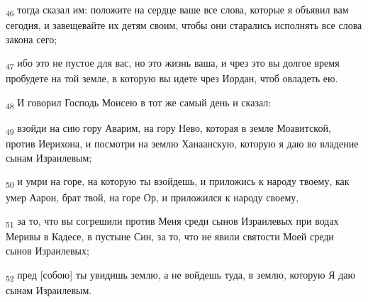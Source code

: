 \begin{tcolorbox}
\textsubscript{46} тогда сказал им: положите на сердце ваше все слова, которые я объявил вам сегодня, и завещевайте их детям своим, чтобы они старались исполнять все слова закона сего;
\end{tcolorbox}
\begin{tcolorbox}
\textsubscript{47} ибо это не пустое для вас, но это жизнь ваша, и чрез это вы долгое время пробудете на той земле, в которую вы идете чрез Иордан, чтоб овладеть ею.
\end{tcolorbox}
\begin{tcolorbox}
\textsubscript{48} И говорил Господь Моисею в тот же самый день и сказал:
\end{tcolorbox}
\begin{tcolorbox}
\textsubscript{49} взойди на сию гору Аварим, на гору Нево, которая в земле Моавитской, против Иерихона, и посмотри на землю Ханаанскую, которую я даю во владение сынам Израилевым;
\end{tcolorbox}
\begin{tcolorbox}
\textsubscript{50} и умри на горе, на которую ты взойдешь, и приложись к народу твоему, как умер Аарон, брат твой, на горе Ор, и приложился к народу своему,
\end{tcolorbox}
\begin{tcolorbox}
\textsubscript{51} за то, что вы согрешили против Меня среди сынов Израилевых при водах Меривы в Кадесе, в пустыне Син, за то, что не явили святости Моей среди сынов Израилевых;
\end{tcolorbox}
\begin{tcolorbox}
\textsubscript{52} пред [собою] ты увидишь землю, а не войдешь туда, в землю, которую Я даю сынам Израилевым.
\end{tcolorbox}
